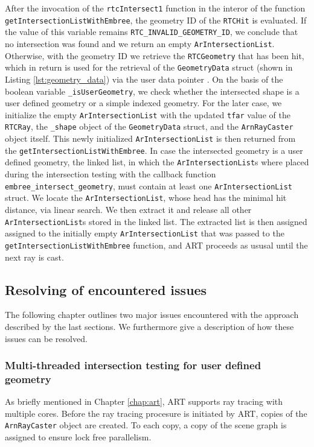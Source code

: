After the invocation of the \texttt{rtcIntersect1} function in the interor of the function \texttt{getIntersectionListWithEmbree}, the geometry ID of the \texttt{RTCHit} is evaluated. If the value of this variable remains \texttt{RTC\_INVALID\_GEOMETRY\_ID}, we conclude that no intersection was found and we return an empty \texttt{ArIntersectionList}. Otherwise, with the geometry ID we retrieve the \texttt{RTCGeometry} that has been hit, which in return is used for the retrieval of the \texttt{GeometryData} struct (shown in Listing \ref{lst:geometry_data}) via the user data pointer . On the basis of the boolean variable \texttt{\_isUserGeometry}, we check whether the intersected shape is a user defined geometry or a simple indexed geometry. For the later case, we initialize the empty \texttt{ArIntersectionList} with the updated \texttt{tfar} value of the \texttt{RTCRay}, the \texttt{\_shape} object of the \texttt{GeometryData} struct, and the \texttt{ArnRayCaster} object itself. This newly initialized \texttt{ArIntersectionList} is then returned from the \texttt{getIntersectionListWithEmbree}.
In case the intersected geometry is a user defined geometry, the linked list, in which the \texttt{ArIntersectionList}s where placed during the intersection testing with the callback function \texttt{embree\_intersect\_geometry}, must contain at least one \texttt{ArIntersectionList} struct. We locate the \texttt{ArIntersectionList}, whose head has the minimal hit distance, via linear search. We then extract it and release all other \texttt{ArIntersectionList}s stored in the linked list. The extracted list is then assigned assigned to the initially empty \texttt{ArIntersectionList} that was passed to the \texttt{getIntersectionListWithEmbree} function, and ART proceeds as ususal until the next ray is cast.


\subsection{Resolving of encountered issues}
\label{sec:issues_user}
The following chapter outlines two major issues encountered with the approach described by the last sections. We furthermore give a description of how these issues can be resolved.

\subsubsection{Multi-threaded intersection testing for user defined geometry}
As briefly mentioned in Chapter \ref{chap:art}, ART supports ray tracing with multiple cores.
Before the ray tracing procesure is initiated by ART, copies of the \texttt{ArnRayCaster} object are created. To each copy, a copy of the scene graph is assigned to ensure lock free parallelism.

